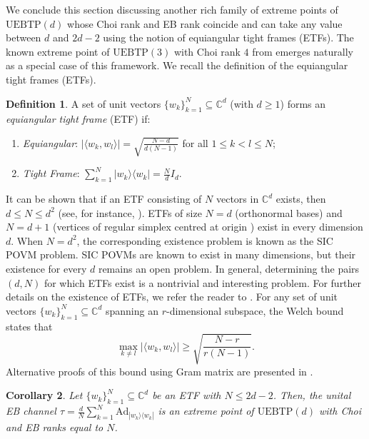 \documentclass[11pt,reqno]{amsart}
\theoremstyle{definition}
\newtheorem{defn}{Definition}[section]
\theoremstyle{plain}
\newtheorem{cor}[defn]{Corollary}
\theoremstyle{remark}
\newcommand{\la}{\langle}
\newcommand{\ra}{\rangle}
\numberwithin{equation}{section}%
\begin{document}
We conclude this section discussing another rich family of extreme points of $\mathrm{UEBTP}(d)$ whose Choi rank and EB rank coincide and can take any value between $d$ and $2d-2$ using the notion of equiangular tight frames (ETFs). The known extreme point of $\mathrm{UEBTP}(3)$ with Choi rank $4$ from \cite{HSR} emerges naturally as a special case of this framework. We recall the definition of the equiangular tight frames (ETFs).


\begin{defn}
	A set of unit vectors $\{w_k\}_{k=1}^N \subseteq \mathbb{C}^d$ (with $d \ge 1$) forms an \textit{equiangular tight frame} (ETF) if:
	\begin{enumerate}
		\item \textit{Equiangular}: $|\la w_k, w_l\ra| = \sqrt{\frac{N-d}{d(N-1)}}$ for all $1 \le k < l \le N$;
		\item \textit{Tight Frame}: $\sum_{k=1}^N |w_k\ra\la w_k| = \frac{N}{d}I_d$.
	\end{enumerate}
\end{defn}



It can be shown that if an ETF consisting of $N$ vectors in $\mathbb{C}^d$ exists, then $d\leq N\leq d^2$ (see, for instance, \cite[Theorem 5]{TroJA05}). ETFs of size $N=d$ (orthonormal bases) and $N=d+1$ (vertices of regular simplex centred at origin \cite{CK, SH}) exist in every dimension $d$. When $N=d^2$, the corresponding existence problem is known as the SIC POVM problem. SIC POVMs are known to exist in many dimensions, but their existence for every $d$ remains an open problem. In general, determining the pairs $(d,N)$ for which ETFs exist is a nontrivial and interesting problem. For further details on the existence of ETFs, we refer the reader to \cite{S, STDH}. For any set of unit vectors $\{w_k\}_{k=1}^N \subseteq \mathbb{C}^d$ spanning an $r$-dimensional subspace, the Welch bound \cite{W} states that
\begin{equation}\label{EMD:eq2}
	\max_{k \ne l} |\la w_k, w_l\ra| \ge \sqrt{\frac{N-r}{r(N-1)}}.
\end{equation}
Alternative proofs of this bound using Gram matrix are presented in \cite{SH, STDH}.


\begin{cor}\label{EMD:cor4}
	Let $\{w_k\}_{k=1}^N \subseteq\mathbb{C}^d$ be an ETF with $N \le 2d-2$. Then, the unital EB channel $\tau = \frac{d}{N}\sum_{k=1}^N \text{Ad}_{|w_k\ra\la w_k|}$ is an extreme point of $\mathrm{UEBTP}(d)$ with Choi and EB ranks equal to $N$.
\end{cor}
\end{document}
